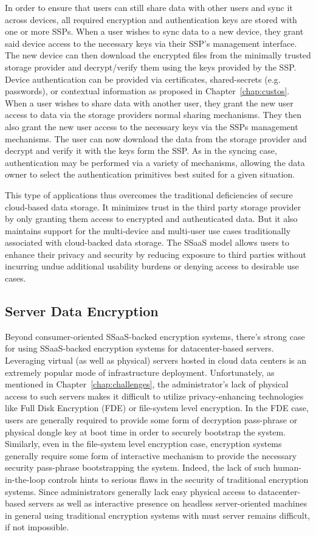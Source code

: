 In order to ensure that users can still share data with other users
and sync it across devices, all required encryption and authentication
keys are stored with one or more SSPs. When a user wishes to sync data
to a new device, they grant said device access to the necessary keys
via their SSP's management interface. The new device can then download
the encrypted files from the minimally trusted storage provider and
decrypt/verify them using the keys provided by the SSP. Device
authentication can be provided via certificates, shared-secrets
(e.g. passwords), or contextual information as proposed in
Chapter~\ref{chap:custos}. When a user wishes to share data with
another user, they grant the new user access to data via the storage
providers normal sharing mechanisms. They then also grant the new user
access to the necessary keys via the SSPs management mechanisms. The
user can now download the data from the storage provider and decrypt
and verify it with the keys form the SSP. As in the syncing case,
authentication may be performed via a variety of mechanisms, allowing
the data owner to select the authentication primitives best suited for
a given situation.

This type of applications thus overcomes the traditional deficiencies
of secure cloud-based data storage. It minimizes trust in the third
party storage provider by only granting them access to encrypted and
authenticated data. But it also maintains support for the multi-device
and multi-user use cases traditionally associated with cloud-backed
data storage. The SSaaS model allows users to enhance their privacy
and security by reducing exposure to third parties without incurring
undue additional usability burdens or denying access to desirable use
cases.

\subsection{Server Data Encryption}

Beyond consumer-oriented SSaaS-backed encryption systems, there's
strong case for using SSaaS-backed encryption systems for
datacenter-based servers. Leveraging virtual (as well as physical)
servers hosted in cloud data centers is an extremely popular mode of
infrastructure deployment. Unfortunately, as mentioned in
Chapter~\ref{chap:challenges}, the administrator's lack of physical
access to such servers makes it difficult to utilize privacy-enhancing
technologies like Full Disk Encryption (FDE) or file-system level
encryption. In the FDE case, users are generally required to provide
some form of decryption pass-phrase or physical dongle key at boot
time in order to securely bootstrap the system. Similarly, even in the
file-system level encryption case, encryption systems generally
require some form of interactive mechanism to provide the necessary
security pass-phrase bootstrapping the system. Indeed, the lack of
such human-in-the-loop controls hints to serious flaws in the security
of traditional encryption systems. Since administrators generally lack
easy physical access to datacenter-based servers as well as
interactive presence on headless server-oriented machines in general
using traditional encryption systems with must server remains
difficult, if not impossible.

